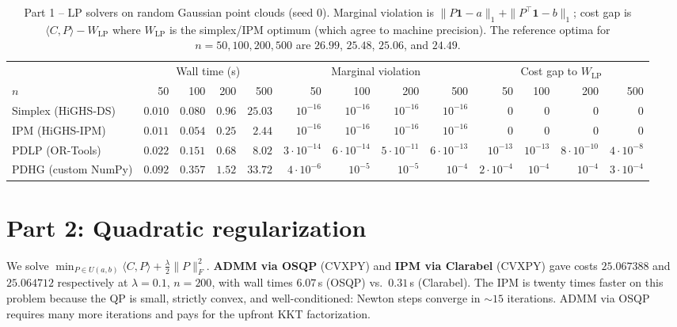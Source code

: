 \documentclass{article}
\begin{document}
\begin{table}[t]
\centering
\caption{Part 1 -- LP solvers on random Gaussian point clouds (seed $0$).
Marginal violation is $\|P\mathbf 1-a\|_1+\|P^{\!\top}\!\mathbf 1-b\|_1$;
cost gap is $\langle C,P\rangle - W_{\mathrm{LP}}$ where $W_{\mathrm{LP}}$
is the simplex/IPM optimum (which agree to machine precision).  The
reference optima for $n=50,100,200,500$ are $26.99$, $25.48$, $25.06$,
and $24.49$.}
\label{tab:part1}
\scriptsize
\setlength{\tabcolsep}{3pt}
\begin{tabular}{l rrrr rrrr rrrr}
\toprule
& \multicolumn{4}{c}{Wall time (s)}
& \multicolumn{4}{c}{Marginal violation}
& \multicolumn{4}{c}{Cost gap to $W_{\mathrm{LP}}$} \\
\cmidrule(lr){2-5}\cmidrule(lr){6-9}\cmidrule(lr){10-13}
$n$ & 50 & 100 & 200 & 500
    & 50 & 100 & 200 & 500
    & 50 & 100 & 200 & 500 \\
\midrule
Simplex (HiGHS-DS)
  & $0.010$ & $0.080$ & $0.96$ & $25.03$
  & $\!10^{-16}\!$ & $\!10^{-16}\!$ & $\!10^{-16}\!$ & $\!10^{-16}\!$
  & $0$ & $0$ & $0$ & $0$ \\
IPM (HiGHS-IPM)
  & $0.011$ & $0.054$ & $0.25$ & $2.44$
  & $\!10^{-16}\!$ & $\!10^{-16}\!$ & $\!10^{-16}\!$ & $\!10^{-16}\!$
  & $0$ & $0$ & $0$ & $0$ \\
PDLP (OR-Tools)
  & $0.022$ & $0.151$ & $0.68$ & $8.02$
  & $\!3\!\cdot\!10^{-14}\!$ & $\!6\!\cdot\!10^{-14}\!$ & $\!5\!\cdot\!10^{-11}\!$ & $\!6\!\cdot\!10^{-13}\!$
  & $\!10^{-13}\!$ & $\!10^{-13}\!$ & $\!8\!\cdot\!10^{-10}\!$ & $\!4\!\cdot\!10^{-8}\!$ \\
PDHG (custom NumPy)
  & $0.092$ & $0.357$ & $1.52$ & $33.72$
  & $\!4\!\cdot\!10^{-6}\!$ & $\!10^{-5}\!$ & $\!10^{-5}\!$ & $\!10^{-4}\!$
  & $\!2\!\cdot\!10^{-4}\!$ & $\!10^{-4}\!$ & $\!10^{-4}\!$ & $\!3\!\cdot\!10^{-4}\!$ \\
\bottomrule
\end{tabular}
\end{table}

\section{Part 2: Quadratic regularization}
\label{sec:part2}

We solve $\min_{P\in U(a,b)}\langle C,P\rangle + \tfrac\lambda 2\|P\|_F^2$.
\textbf{ADMM via OSQP} (CVXPY) and \textbf{IPM via Clarabel} (CVXPY)
gave costs $25.067388$ and $25.064712$ respectively at $\lambda\!=\!0.1$,
$n\!=\!200$, with wall times $6.07$\,s (OSQP) vs.\ $0.31$\,s (Clarabel).
The IPM is twenty times faster on this problem because the QP is small,
strictly convex, and well-conditioned: Newton steps converge in $\sim\!15$
iterations.  ADMM via OSQP requires many more iterations and pays for
the upfront KKT factorization.
\end{document}
